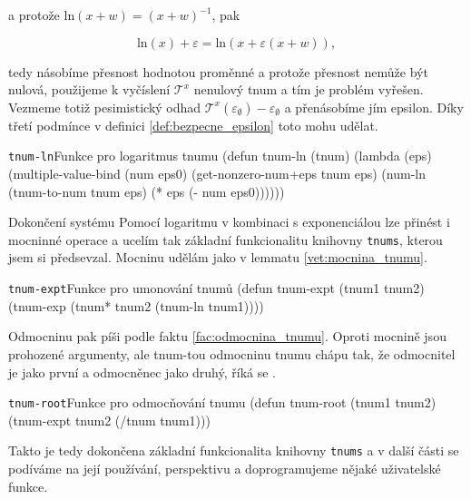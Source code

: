 a protože $\mathrm{ln}(x+w)=(x+w)^{-1}$, pak

\begin{equation}
\mathrm{ln}(x)+\varepsilon=\mathrm{ln}(x+\varepsilon(x+w)),
\end{equation}

tedy násobíme přesnost hodnotou proměnné a protože přesnost nemůže být nulová, použijeme k vyčíslení $\mathcal{T}^x$ nenulový tnum a tím je problém vyřešen. Vezmeme totiž pesimistický odhad $\mathcal{T}^x(\varepsilon_\emptyset)-\varepsilon_\emptyset$ a přenásobíme jím epsilon. Díky třetí podmínce v definici \ref{def:bezpecne_epsilon} toto mohu udělat.

\begin{lispcode}{\texttt{tnum-ln}}{Funkce pro logaritmus tnumu}
(\textcolor{funkcionalni}{defun} \textcolor{pojmenovan}{tnum-ln} (tnum)
  (\textcolor{funkcionalni}{lambda} (eps)
    (\textcolor{matematicke}{multiple-value-bind} (num eps0)
      (\textcolor{moje}{get-nonzero-num+eps} tnum eps)
      (\textcolor{moje}{num-ln} (\textcolor{moje}{tnum-to-num} tnum eps) (\textcolor{matematicke}{*} eps (\textcolor{matematicke}{-} num eps0))))))
\end{lispcode}

\begin{myremark}{Dokončení systému}
Pomocí logaritmu v kombinaci s exponenciálou lze přinést i mocninné operace a ucelím tak základní funkcionalitu knihovny \texttt{tnums}, kterou jsem si předsevzal. Mocninu udělám jako v lemmatu \ref{vet:mocnina_tnumu}.
\begin{lispcode}{\texttt{tnum-expt}}{Funkce pro umonování tnumů}
(\textcolor{funkcionalni}{defun} \textcolor{pojmenovan}{tnum-expt} (tnum1 tnum2)
  (\textcolor{moje}{tnum-exp} (\textcolor{moje}{tnum*} tnum2 (\textcolor{moje}{tnum-ln} tnum1))))
\end{lispcode}

Odmocninu pak píši podle faktu \ref{fac:odmocnina_tnumu}. Oproti mocnině jsou prohozené argumenty, ale tnum-tou odmocninu tnumu chápu tak, že odmocnitel je jako první a odmocněnec jako druhý, říká se .

\begin{lispcode}{\texttt{tnum-root}}{Funkce pro odmocňování tnumu}
(\textcolor{funkcionalni}{defun} \textcolor{pojmenovan}{tnum-root} (tnum1 tnum2)
  (\textcolor{moje}{tnum-expt} tnum2 (\textcolor{moje}{/tnum} tnum1)))
\end{lispcode}
\end{myremark}

Takto je tedy dokončena základní funkcionalita knihovny \texttt{tnums} a v další části se podíváme na její používání, perspektivu a doprogramujeme nějaké uživatelské funkce.